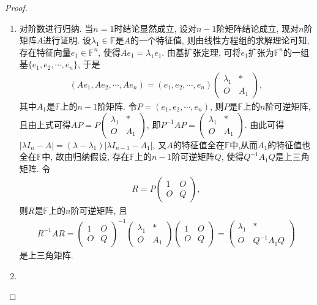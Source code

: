 \documentclass[../../main.tex]{subfiles}%
\begin{document}
\begin{proof}
\begin{enumerate}
\item 对阶数进行归纳. 当\(n = 1\)时结论显然成立, 设对\(n - 1\)阶矩阵结论成立, 现对\(n\)阶矩阵\(A\)进行证明. 设\(\lambda_{1} \in \mathbb{F}\)是\(A\)的一个特征值, 则由线性方程组的求解理论可知, 存在特征向量\(e_{1} \in \mathbb{F}^n\), 使得\(Ae_{1}=\lambda_{1}e_{1}\). 由基扩张定理, 可将\(e_{1}\)扩张为\(\mathbb{F}^n\)的一组基\(\{e_{1},e_{2},\cdots ,e_{n}\}\), 于是
\begin{align*}
(Ae_{1},Ae_{2},\cdots ,Ae_{n})=(e_{1},e_{2},\cdots ,e_{n})\begin{pmatrix}
\lambda_{1}& *\\
O&A_{1}
\end{pmatrix},
\end{align*}
其中\(A_{1}\)是\(\mathbb{F}\)上的\(n - 1\)阶矩阵. 令\(P=(e_{1},e_{2},\cdots ,e_{n})\), 则\(P\)是\(\mathbb{F}\)上的\(n\)阶可逆矩阵, 且由上式可得\(AP = P\begin{pmatrix}
\lambda_{1}& *\\
O&A_{1}
\end{pmatrix}\), 即\(P^{-1}AP=\begin{pmatrix}
\lambda_{1}& *\\
O&A_{1}
\end{pmatrix}\). 由此可得\(|\lambda I_{n}-A| = (\lambda - \lambda_{1})|\lambda I_{n - 1}-A_{1}|\), 又$A$的特征值全在$\mathbb{F}$中,从而\(A_{1}\)的特征值也全在\(\mathbb{F}\)中, 故由归纳假设, 存在\(\mathbb{F}\)上的\(n - 1\)阶可逆矩阵\(Q\), 使得\(Q^{-1}A_{1}Q\)是上三角矩阵. 令
\begin{align*}
R = P\begin{pmatrix}
1& O\\
O& Q
\end{pmatrix},
\end{align*}
则\(R\)是\(\mathbb{F}\)上的\(n\)阶可逆矩阵, 且
\begin{align*}
R^{-1}AR=\begin{pmatrix}
1& O\\
O& Q
\end{pmatrix}^{-1}\begin{pmatrix}
\lambda_{1}& *\\
O&A_{1}
\end{pmatrix}\begin{pmatrix}
1& O\\
O& Q
\end{pmatrix}=\begin{pmatrix}
\lambda_{1}& *\\
O&Q^{-1}A_{1}Q
\end{pmatrix}
\end{align*}
是上三角矩阵. 

\item 
\end{enumerate}

\end{proof}
\end{document}
